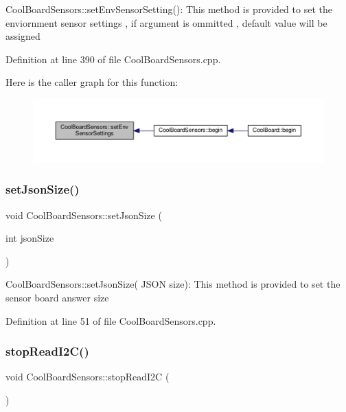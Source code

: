 Cool\+Board\+Sensors\+::set\+Env\+Sensor\+Setting()\+: This method is provided to set the enviornment sensor settings , if argument is ommitted , default value will be assigned 

Definition at line 390 of file Cool\+Board\+Sensors.\+cpp.

Here is the caller graph for this function\+:\nopagebreak
\begin{figure}[H]
\begin{center}
\leavevmode
\includegraphics[width=350pt]{class_cool_board_sensors_a406307ffd70272282d91479c7ed8d66f_icgraph}
\end{center}
\end{figure}
\mbox{\label{class_cool_board_sensors_ab76e6dbd6efbcc25ff460535badd8d45}} 
\subsubsection{\texorpdfstring{set\+Json\+Size()}{setJsonSize()}}
{\footnotesize\ttfamily void Cool\+Board\+Sensors\+::set\+Json\+Size (\begin{DoxyParamCaption}\item[{int}]{json\+Size }\end{DoxyParamCaption})}

Cool\+Board\+Sensors\+::set\+Json\+Size( J\+S\+O\+N size)\+: This method is provided to set the sensor board answer size 

Definition at line 51 of file Cool\+Board\+Sensors.\+cpp.

\mbox{\label{class_cool_board_sensors_ab67b900b9e5e7c18d52d2d9107ba171b}} 
\subsubsection{\texorpdfstring{stop\+Read\+I2\+C()}{stopReadI2C()}}
{\footnotesize\ttfamily void Cool\+Board\+Sensors\+::stop\+Read\+I2C (\begin{DoxyParamCaption}{ }\end{DoxyParamCaption})}

